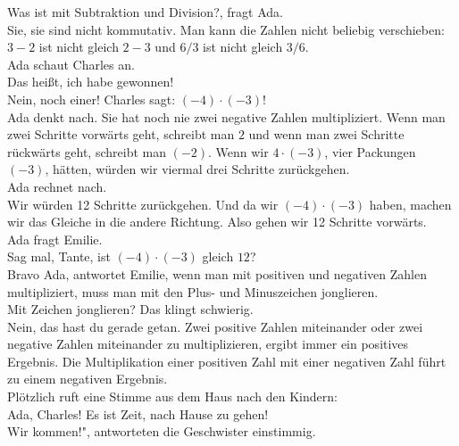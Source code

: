\frqq{}Was ist mit Subtraktion und Division?\flqq{}, fragt Ada.\\
\frqq{}Sie, sie sind nicht kommutativ. Man kann die Zahlen nicht beliebig verschieben: $3 - 2$ ist nicht gleich $2 - 3$ und $6/3$ ist nicht gleich $3/6$.\flqq{}\\
Ada schaut Charles an.\\
\frqq{}Das heißt, ich habe gewonnen!\flqq{}\\
\frqq{}Nein, noch einer! Charles sagt: $(-4) \cdot (-3)$!\flqq{}\\
Ada denkt nach. Sie hat noch nie zwei negative Zahlen multipliziert.
\frqq{} Wenn man zwei Schritte vorwärts geht, schreibt man $2$ und wenn man zwei Schritte rückwärts geht, schreibt man $(-2)$. Wenn wir $4 \cdot (-3)$, vier Packungen $(-3)$, hätten, würden wir viermal drei Schritte zurückgehen.\flqq{}\\
Ada rechnet nach.\\
\frqq{}Wir würden 12 Schritte zurückgehen. Und da wir $ (-4) \cdot (-3)$ haben, machen wir das Gleiche in die andere Richtung. Also gehen wir 12 Schritte vorwärts.\flqq{}\\
Ada fragt Emilie.\\
\frqq{}Sag mal, Tante, ist $(-4) \cdot (-3)$ gleich $12$?\\
\frqq{}Bravo Ada\flqq{}, antwortet Emilie, \frqq{}wenn man mit positiven und negativen Zahlen multipliziert, muss man mit den Plus- und Minuszeichen jonglieren.\flqq{}\\
\frqq{}Mit Zeichen jonglieren? Das klingt schwierig.\flqq{}\\
\frqq{}Nein, das hast du gerade getan. Zwei positive Zahlen miteinander oder zwei negative Zahlen miteinander zu multiplizieren, ergibt immer ein positives Ergebnis. Die Multiplikation einer positiven Zahl mit einer negativen Zahl führt zu einem negativen Ergebnis.\flqq{}\\
Plötzlich ruft eine Stimme aus dem Haus nach den Kindern:\\
\frqq{}Ada, Charles! Es ist Zeit, nach Hause zu gehen!\flqq{}\\
\frqq{}Wir kommen!", antworteten die Geschwister einstimmig.\flqq{}